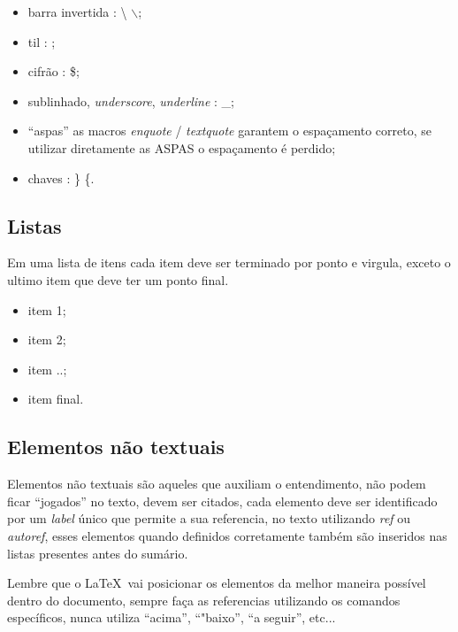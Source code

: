 \begin{itemize}
\item barra invertida : \textbackslash   {}    $\backslash$;
\item til  :   ;
\item cifrão : \$;
\item sublinhado, \emph{underscore}, \emph{underline} : \_;
\item \enquote{aspas} as macros \emph{enquote} / \emph{textquote} garantem o espaçamento correto, se utilizar diretamente as ASPAS o espaçamento é perdido;
\item chaves : \} \{.
\end{itemize}

\subsection{Listas}

Em uma lista de itens cada item deve ser terminado por ponto e virgula, exceto o ultimo item que deve ter um ponto final.

\begin{itemize}
\item item 1;
\item item 2;
\item item ..;
\item item final.
\end{itemize}






\subsection{Elementos não textuais}

Elementos não textuais são aqueles que auxiliam o entendimento, não podem ficar \enquote{jogados} no texto, devem ser citados, cada elemento deve ser identificado por um \emph{label} único que permite a sua referencia, no texto utilizando \emph{ref} ou \emph{autoref}, esses elementos quando definidos corretamente também são inseridos nas listas presentes antes do sumário.

Lembre que o \LaTeX \  vai posicionar os elementos  da melhor maneira possível dentro do documento, sempre faça as referencias utilizando os comandos específicos, nunca utiliza \enquote{acima}, \enquote{"baixo}, \enquote{a seguir}, etc...

